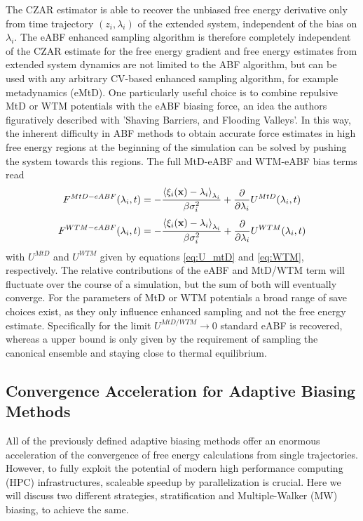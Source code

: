 The CZAR estimator is able to recover the unbiased free energy derivative only from time trajectory $(z_i,\lambda_i)$ of the extended system, independent of the bias on $\lambda_i$.
The eABF enhanced sampling algorithm is therefore completely independent of the CZAR estimate for the free energy gradient and free energy estimates from extended system dynamics are not limited to the ABF algorithm, but can be used with any arbitrary CV-based enhanced sampling algorithm, for example metadynamics (eMtD).
One particularly useful choice is to combine repulsive MtD or WTM potentials with the eABF biasing force, an idea the authors figuratively described with 'Shaving Barriers, and Flooding Valleys'.\autocite{fu2018zooming}
In this way, the inherent difficulty in ABF methods to obtain accurate force estimates in high free energy regions at the beginning of the simulation can be solved by pushing the system towards this regions.
The full MtD-eABF and WTM-eABF bias terms read
\begin{equation}
  F^{MtD-eABF}(\lambda_i, t) = -\frac{\braket{\xi_i(\textbf{x})-\lambda_i}_{\lambda_i}}{\beta \sigma_i^2}+\frac{\partial}{\partial \lambda_i} U^{MtD}(\lambda_i,t)
\end{equation}
\begin{equation}
  F^{WTM-eABF}(\lambda_i, t) = -\frac{\braket{\xi_i(\textbf{x})-\lambda_i}_{\lambda_i}}{\beta \sigma_i^2}+\frac{\partial}{\partial \lambda_i} U^{WTM}(\lambda_i,t)
\end{equation}
with $U^{MtD}$ and $U^{WTM}$ given by equations \ref{eq:U_mtD} and \ref{eq:WTM}, respectively.
The relative contributions of the eABF and MtD/WTM term will fluctuate over the course of a simulation, but the sum of both will eventually converge.
For the parameters of MtD or WTM potentials a broad range of save choices exist, as they only influence enhanced sampling and not the free energy estimate.
Specifically for the limit $U^{MtD/WTM}\rightarrow 0$ standard eABF is recovered, whereas a upper bound is only given by the requirement of sampling the canonical ensemble and staying close to thermal equilibrium.

\newpage
\subsection{Convergence Acceleration for Adaptive Biasing Methods}
\label{sec:MW}
All of the previously defined adaptive biasing methods offer an enormous acceleration of the convergence of free energy calculations from single trajectories.
However, to fully exploit the potential of modern high performance computing (HPC) infrastructures, scaleable speedup by parallelization is crucial.
Here we will discuss two different strategies, stratification and Multiple-Walker (MW) biasing, to achieve the same.

